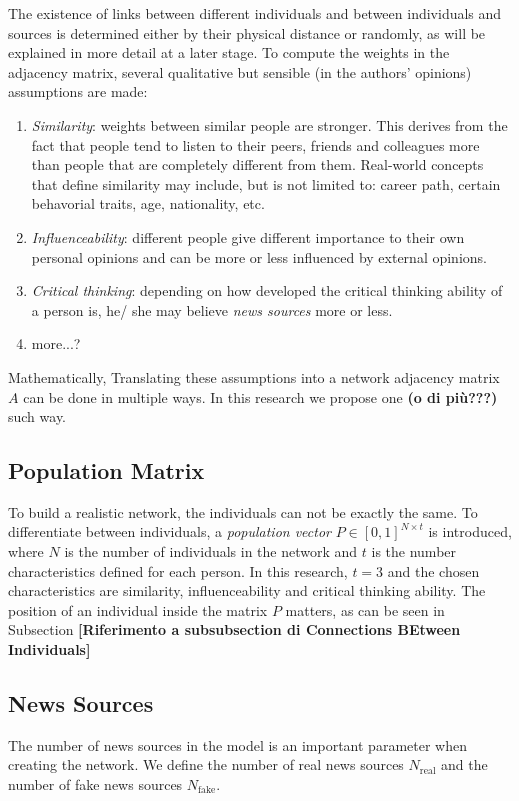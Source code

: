 The existence of links between different individuals and between individuals and sources is determined either by their physical distance or randomly, as will be explained in more detail at a later stage.
To compute the weights in the adjacency matrix, several qualitative but sensible (in the authors' opinions) assumptions are made:
\renewcommand{\theenumi}{\roman{enumi}}
\begin{enumerate}
\item \textit{Similarity}: weights between similar people are stronger. This derives from the fact that people tend to listen to their peers, friends and colleagues more than people that are completely different from them. Real-world concepts that define similarity may include, but is not limited to: career path, certain behavorial traits, age, nationality, etc.
\item \textit{Influenceability}: different people give different importance to their own personal opinions and can be more or less influenced by external opinions.
\item \textit{Critical thinking}: depending on how developed the critical thinking ability of a person is, he/ she may believe \textit{news sources} more or less.
\item more...?
\end{enumerate}
Mathematically, 
Translating these assumptions into a network adjacency matrix $A$ can be done in multiple ways. In this research we propose one \textbf{(o di più???)} such way. 
\subsection{Population Matrix}
To build a realistic network, the individuals can not be exactly the same. To differentiate between individuals, a \textit{population vector} $P \in {[0,1]}^{N \times t}$ is introduced, where $N$ is the number of individuals in the network and $t$ is the number characteristics defined for each person. In this research, $t=3$ and the chosen characteristics are similarity, influenceability and critical thinking ability. The position of an individual inside the matrix $P$ matters, as can be seen in Subsection \textbf{[Riferimento a subsubsection di Connections BEtween Individuals]}
\subsection{News Sources}
The number of news sources in the model is an important parameter when creating the network. We define the number of real news sources $N_{\text{real}}$ and the number of fake news sources $N_{\text{fake}}$.
